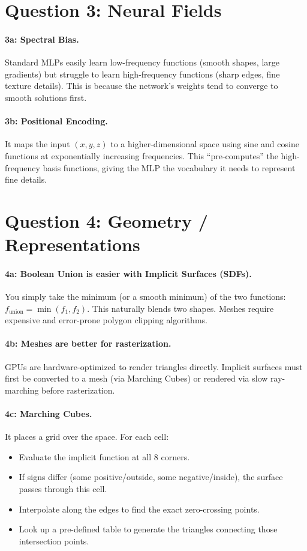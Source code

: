 \documentclass[11pt]{article}
\begin{document}
\section*{Question 3: Neural Fields}

\paragraph{3a: Spectral Bias.} Standard MLPs easily learn low-frequency functions (smooth shapes, large gradients) but struggle to learn high-frequency functions (sharp edges, fine texture details). This is because the network's weights tend to converge to smooth solutions first.

\paragraph{3b: Positional Encoding.} It maps the input $(x,y,z)$ to a higher-dimensional space using sine and cosine functions at exponentially increasing frequencies. This ``pre-computes'' the high-frequency basis functions, giving the MLP the vocabulary it needs to represent fine details.

\section*{Question 4: Geometry / Representations}

\paragraph{4a: Boolean Union is easier with Implicit Surfaces (SDFs).} You simply take the minimum (or a smooth minimum) of the two functions: $f_{\text{union}} = \min(f_1, f_2)$. This naturally blends two shapes. Meshes require expensive and error-prone polygon clipping algorithms.

\paragraph{4b: Meshes are better for rasterization.} GPUs are hardware-optimized to render triangles directly. Implicit surfaces must first be converted to a mesh (via Marching Cubes) or rendered via slow ray-marching before rasterization.

\paragraph{4c: Marching Cubes.} It places a grid over the space. For each cell:
\begin{itemize}
    \item Evaluate the implicit function at all 8 corners.
    \item If signs differ (some positive/outside, some negative/inside), the surface passes through this cell.
    \item Interpolate along the edges to find the exact zero-crossing points.
    \item Look up a pre-defined table to generate the triangles connecting those intersection points.
\end{itemize}
\end{document}
